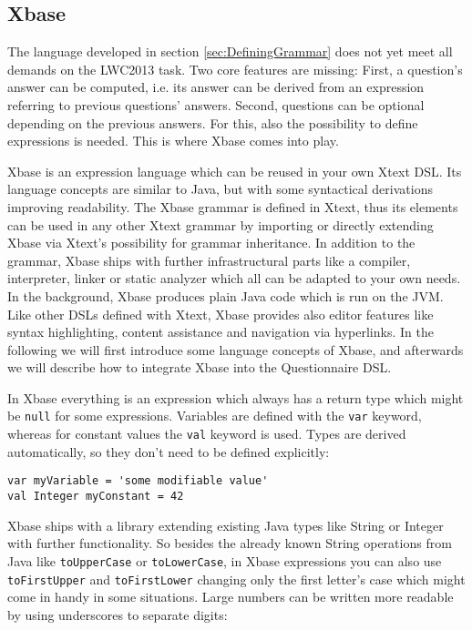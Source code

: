 \subsection{Xbase} \label{sec:Xbase}

The language developed in section \ref{sec:DefiningGrammar} does not yet meet all 
demands on the LWC2013 task. Two core features are missing: First, a question's 
answer can be computed, i.e. its answer can be derived from an expression referring 
to previous questions' answers. Second, questions can be optional depending on the 
previous answers. For this, also the possibility to define expressions is needed. This
is where Xbase comes into play.

Xbase is an expression language which can be reused in your own Xtext DSL. Its language
concepts are similar to Java, but with some syntactical derivations improving readability.
The Xbase grammar is defined in Xtext, thus its elements can be used in any other Xtext grammar
by importing or directly extending Xbase via Xtext's possibility for grammar inheritance.
In addition to the grammar, Xbase ships with further infrastructural parts like a compiler, 
interpreter, linker or static analyzer which all can be adapted to your own needs. In
the background, Xbase produces plain Java code which is run on the JVM. Like
other DSLs defined with Xtext, Xbase provides also editor features like syntax highlighting, 
content assistance and navigation via hyperlinks. In the following we will first introduce
some language concepts of Xbase, and afterwards we will describe how to integrate Xbase
into the Questionnaire DSL.

In Xbase everything is an expression which always has a return type which might be \texttt{null} 
for some expressions. Variables are defined with the \texttt{var} keyword, whereas for 
constant values the \texttt{val} keyword is used. Types are derived automatically, so they 
don't need to be defined explicitly:

\begin{lstlisting}[language=Xbase]
var myVariable = 'some modifiable value'
val Integer myConstant = 42  
\end{lstlisting}

Xbase ships with a library extending existing Java types like String or Integer with further 
functionality. So besides the already known String operations from Java like 
\texttt{toUpperCase} or \texttt{toLowerCase}, in Xbase expressions you can also use \texttt{toFirstUpper}
and \texttt{toFirstLower} changing only the first letter's case which might come in handy 
in some situations. Large numbers can be written more readable by using underscores to
separate digits:

